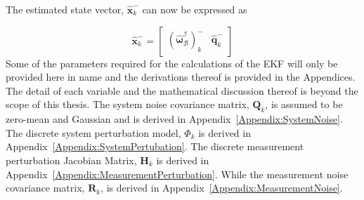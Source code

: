 The estimated state vector, $\hat{\mathbf{x}}_k^-$ can now be expressed as 

\begin{equation}
	\hat{\mathbf{x}}_k^- = \begin{bmatrix} (\boldsymbol{\hat{\omega}}_{\mathcal{B}}^{\mathcal{I}})_k^- & \hat{\mathbf{q}}_k^-\end{bmatrix}
\end{equation}
Some of the parameters required for the calculations of the EKF will only be provided here in name and the derivations thereof is provided in the Appendices. The detail of each variable and the mathematical discussion thereof is beyond the scope of this thesis. The system noise covariance matrix, $\mathbf{Q}_k$, is assumed to be zero-mean and Gaussian and is derived in Appendix~\ref{Appendix:SystemNoise}. The discrete system perturbation model, $\Phi_k$ is derived in Appendix~\ref{Appendix:SystemPertubation}. The discrete measurement perturbation Jacobian Matrix, $\mathbf{H}_k$ is derived in Appendix~\ref{Appendix:MeasurementPerturbation}. While the measurement noise covariance matrix, $\mathbf{R}_k$, is derived in Appendix~\ref{Appendix:MeasurementNoise}.

